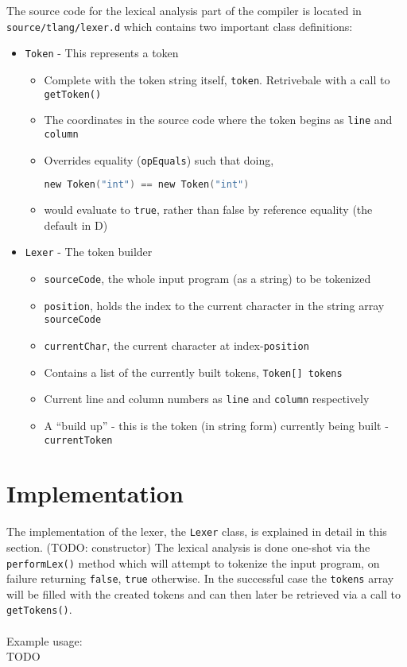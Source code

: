 The source code for the lexical analysis part of the compiler is located
in \texttt{source/tlang/lexer.d} which contains two important class
definitions:
\begin{itemize}
\item \texttt{Token} - This represents a token
\begin{itemize}
\item Complete with the token string itself, \texttt{token}. Retrivebale
with a call to \texttt{getToken()}
\item The coordinates in the source code where the token begins as \texttt{line}
and \texttt{column}
\item Overrides equality (\texttt{opEquals}) such that doing,

\begin{lstlisting}[language=C]
new Token("int") == new Token("int")
\end{lstlisting}
\item would evaluate to \texttt{true}, rather than false by reference equality
(the default in D)
\end{itemize}
\item \texttt{Lexer} - The token builder
\begin{itemize}
\item \texttt{sourceCode}, the whole input program (as a string) to be
tokenized
\item \texttt{position}, holds the index to the current character in the
string array \texttt{sourceCode}
\item \texttt{currentChar}, the current character at index-\texttt{position}
\item Contains a list of the currently built tokens, \texttt{Token[] tokens}
\item Current line and column numbers as \texttt{line} and \texttt{column}
respectively
\item A ``build up'' - this is the token (in string form) currently being
built - \texttt{currentToken}
\end{itemize}
\end{itemize}

\section{Implementation}

The implementation of the lexer, the \texttt{Lexer} class, is explained
in detail in this section. (TODO: constructor) The lexical analysis
is done one-shot via the \texttt{performLex()} method which will
attempt to tokenize the input program, on failure returning \texttt{false},
\texttt{true} otherwise. In the successful case the \texttt{tokens}
array will be filled with the created tokens and can then later be
retrieved via a call to \texttt{getTokens()}.\\
\\
Example usage:\\
TODO

